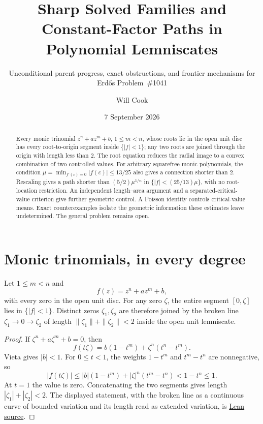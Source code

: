 \documentclass[11pt]{article}
\title{Sharp Solved Families and\\Constant-Factor Paths in Polynomial Lemniscates}
\subtitle{Unconditional parent progress, exact obstructions, and frontier
mechanisms for Erd\H{o}s Problem~\#1041}
\author{Will Cook}
\date{7 September 2026}
\begin{document}
\maketitle
\noteprovenance

\begin{abstract}
Every monic trinomial $z^n+az^m+b$, $1\le m<n$, whose roots lie in the open
unit disc has every root-to-origin segment inside $\{|f|<1\}$; any two
roots are joined through the origin with length less than $2$.
The root equation reduces the radial image to a convex combination of two
controlled values.  For arbitrary squarefree monic polynomials, the condition
$\mu=\min_{f'(c)=0}|f(c)|\le13/25$ also gives a connection shorter than $2$.
Rescaling gives a path shorter than $(5/2)\mu^{1/n}$ in
$\{|f|<(25/13)\mu\}$, with no root-location restriction.  An independent
length--area argument and a separated-critical-value criterion give further
geometric control.  A Poisson identity
controls critical-value means.  Exact counterexamples isolate the geometric
information these estimates leave undetermined.  The general problem remains
open.
\end{abstract}

\section{Monic trinomials, in every degree}
\label{sec:trinomial}

\begin{theorem}
\label{res:trinomial-all-degree}
Let $1\le m<n$ and
\[
 f(z)=z^n+az^m+b,
\]
with every zero in the open unit disc.  For any zero $\zeta$, the entire
segment $[0,\zeta]$ lies in $\{|f|<1\}$.  Distinct zeros $\zeta_1,\zeta_2$
are therefore joined by the broken line $\zeta_1\to0\to\zeta_2$ of length
$\|\zeta_1\|+\|\zeta_2\|<2$ inside the open unit lemniscate.
\end{theorem}

\begin{proof}
If $\zeta^n+a\zeta^m+b=0$, then
\[
 f(t\zeta)=b(1-t^m)+\zeta^n(t^n-t^m).
\]
Vieta gives $|b|<1$.  For $0\le t<1$, the weights $1-t^m$ and $t^m-t^n$
are nonnegative, so
\[
 |f(t\zeta)|\le |b|(1-t^m)+|\zeta|^n(t^m-t^n)
 <1-t^n\le1.
\]
At $t=1$ the value is zero.  Concatenating the two segments gives length
$|\zeta_1|+|\zeta_2|<2$.
The displayed statement, with the broken line as a continuous curve of bounded
variation and its length read as extended variation, is
\href{https://github.com/wcook04/plectis-erdos/blob/f36a98bf3d3e6f65f1074e3b800e3293d5b8a51a/ErdosProblems/Erdos1041/PaperTrinomial.lean#L38}{Lean source}.
\end{proof}
\end{document}
